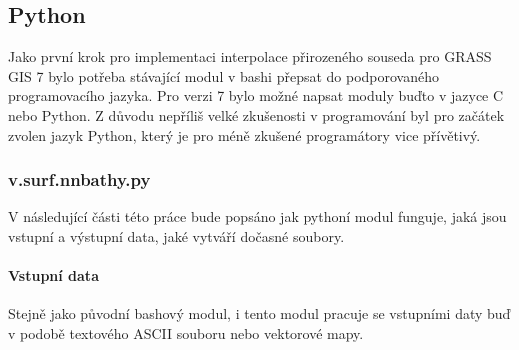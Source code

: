 \documentclass[12pt,a4paper]{article}
\begin{document}

\newpage
\subsection{Python}
Jako první krok pro implementaci interpolace přirozeného souseda pro GRASS GIS 7 bylo potřeba stávající modul v bashi přepsat do podporovaného programovacího jazyka. Pro verzi 7 bylo možné napsat moduly buďto v jazyce C nebo Python. Z důvodu nepříliš velké zkušenosti v programování byl pro začátek zvolen jazyk Python, který je pro méně zkušené programátory vice přívětivý. 

\subsubsection{v.surf.nnbathy.py}

V následující části této práce bude popsáno jak pythoní modul funguje, jaká jsou vstupní a výstupní data, jaké vytváří dočasné soubory.

\paragraph{Vstupní data}
Stejně jako původní bashový modul, i tento modul pracuje se vstupními daty buď v podobě textového ASCII souboru nebo vektorové mapy. 
\end{document}
